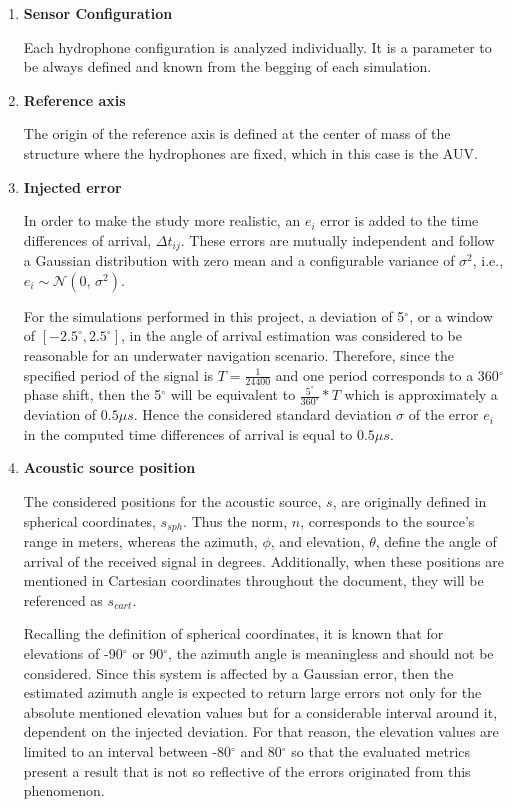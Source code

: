 \begin{enumerate}[label=\alph*)]
	\item \textbf{Sensor Configuration}  
	
	Each hydrophone configuration is analyzed individually. It is a parameter to be always defined and known from the begging of each simulation.
	
	\item \textbf{Reference axis}
	
	 The origin of the reference axis is defined at the center of mass of the structure where the hydrophones are fixed, which in this case is the AUV.
	
	\item \textbf{Injected error} 
	
	In order to make the study more realistic, an $e_i$ error is added to the time differences of arrival, $ \Delta t_{ij}$. These errors are mutually independent and follow a Gaussian distribution with zero mean and a configurable variance of $\sigma^{2}$, i.e., $e_i \sim \mathcal{N}(0,\,\sigma^{2})$. 
	
	 For the simulations performed in this project, a deviation of 5$^{\circ}$, or a window of $[-2.5^{\circ},2.5^{\circ}]$, in the angle of arrival estimation was considered to be reasonable for an underwater navigation scenario. Therefore, since the specified period of the signal is $T = \frac{1}{24400}$ and one period corresponds to a 360$^{\circ}$ phase shift, then the 5$^{\circ}$ will be equivalent to $\frac{5^{\circ}}{360^{\circ}}*T$ which is approximately a deviation of $0.5\mu s$. Hence the considered standard deviation $\sigma$ of the error $e_i$ in the computed time differences of arrival is equal to $0.5\mu s$.
	 
	 \item \textbf{Acoustic source position} 
	 
	 The considered positions for the acoustic source, $s$, are originally defined in spherical coordinates, $s_{sph}$. Thus the norm, $n$, corresponds to the source's range in meters, whereas the azimuth, $\phi$, and elevation, $\theta$, define the angle of arrival of the received signal in degrees. Additionally, when these positions are mentioned in Cartesian coordinates throughout the document, they will be referenced as $s_{cart}$.
	 
	 Recalling the definition of spherical coordinates, it is known that for elevations of -90$^{\circ}$ or 90$^{\circ}$, the azimuth angle is meaningless and should not be considered. Since this system is affected by a Gaussian error, then the estimated azimuth angle is expected to return large errors not only for the absolute mentioned elevation values but for a considerable interval around it, dependent on the injected deviation. For that reason, the elevation values are limited to an interval between -80$^{\circ}$ and 80$^{\circ}$ so that the evaluated metrics present a result that is not so reflective of the errors originated from this phenomenon.
	 

\end{enumerate}
